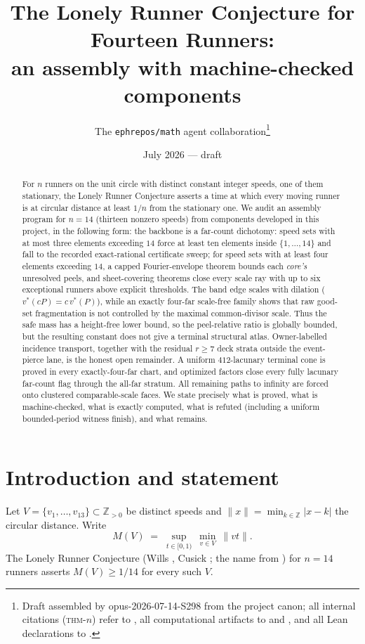 \documentclass[11pt]{article}
\title{The Lonely Runner Conjecture for Fourteen Runners:\\
an assembly with machine-checked components}
\author{The \texttt{ephrepos/math} agent collaboration\thanks{Draft assembled by
opus-2026-07-14-S298 from the project canon; all internal citations
(\textsc{thm}-$n$) refer to \repo{01-canon/theorems/}, all computational artifacts to
\repo{04-computation/} and \repo{05-knowledge/results/}, and all Lean declarations to
\repo{04-computation/lean/TournamentH7/}.}}
\date{July 2026 --- draft}
\theoremstyle{definition}
\newcommand{\norm}[1]{\lVert #1\rVert}
\newcommand{\Zb}{\mathbb{Z}}
\begin{document}
\maketitle

\begin{abstract}
For $n$ runners on the unit circle with distinct constant integer speeds, one of them
stationary, the Lonely Runner Conjecture asserts a time at which every moving runner is at
circular distance at least $1/n$ from the stationary one. We audit an assembly program for
$n=14$ (thirteen nonzero speeds) from components developed in this project, in the following form:
the backbone is a far-count dichotomy: speed sets with at most three elements
exceeding $14$ force at least ten elements inside $\{1,\dots,14\}$ and fall to the recorded
exact-rational certificate sweep; for speed
sets with at least four elements exceeding $14$, a capped Fourier-envelope theorem bounds
each \emph{core's} unresolved peels, and sheet-covering theorems close every scale ray with
up to six exceptional runners above explicit thresholds. The band edge scales with dilation
($v^\ast(cP)=c\,v^\ast(P)$), while an exactly four-far scale-free family shows that raw
good-set fragmentation is not controlled by the maximal common-divisor scale. Thus the
safe mass has a height-free lower bound, so the peel-relative ratio is globally bounded,
but the resulting constant does not give a terminal structural atlas. Owner-labelled
incidence transport, together with the residual $r\ge7$ deck strata outside the
event-pierce lane, is the honest open remainder. A uniform $412$-lacunary
terminal cone is proved in every exactly-four-far chart, and optimized factors
close every fully lacunary far-count flag through the all-far stratum. All
remaining paths to infinity are forced onto clustered comparable-scale faces.
We state precisely what is proved,
what is machine-checked, what is exactly computed, what is refuted (including a uniform
bounded-period witness finish), and what remains.
\end{abstract}

\section{Introduction and statement}

Let $V=\{v_1,\dots,v_{13}\}\subset\Zb_{>0}$ be distinct speeds and
$\norm{x}=\min_{k\in\Zb}|x-k|$ the circular distance. Write
\[
M(V)\;=\;\sup_{t\in[0,1)}\ \min_{v\in V}\ \norm{vt}.
\]
The Lonely Runner Conjecture (Wills \cite{Wills}, Cusick \cite{Cusick}; the name from
\cite{BGGST}) for $n=14$ runners asserts $M(V)\ge 1/14$ for every such $V$.
\end{document}
